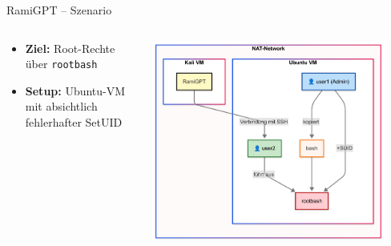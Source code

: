 \documentclass[
	aspectratio=169,	%
	onlytextwidth,		%
	t,					%
	]{beamer}
\begin{document}
\begin{frame}{RamiGPT – Szenario}
	\begin{columns}
		\begin{column}[T]{.45\textwidth}
			\begin{itemize}
				\item \textbf{Ziel:} Root-Rechte über \texttt{rootbash}
				\vspace{2mm}
				\item \textbf{Setup:} Ubuntu-VM mit absichtlich fehlerhafter SetUID
			\end{itemize}
		\end{column}
		\begin{column}[T]{.55\textwidth}
			\centering
			\vspace{-4mm}
			\includegraphics[width=0.9\textwidth]{figures/14.png}
			\label{fig:14}
		\end{column}
	\end{columns}
\end{frame}
\end{document}
